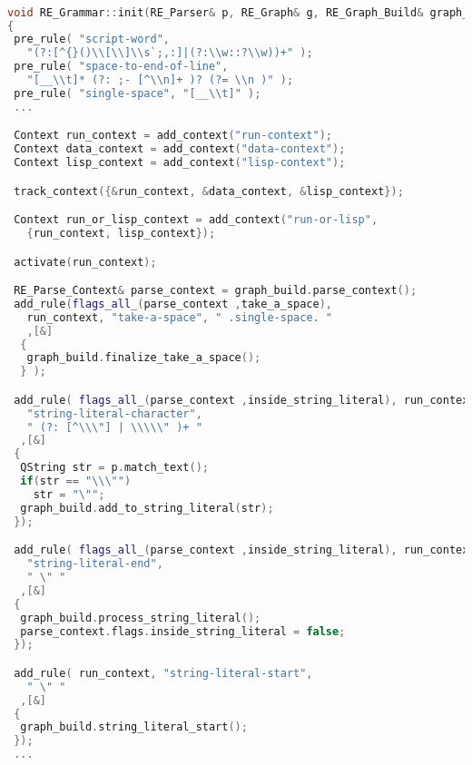 \begin{lstlisting}[caption={%
\emblink{\#lst--rzsyn--\thelstlisting.pgvm-pdf}{Excerpt from a Hypergraph-Oriented Parser}},
  language = C++, numbers = none,label={lst:rzsyn},
    basicstyle = \ttfamily\bfseries\footnotesize, linewidth = \linewidth]

void RE_Grammar::init(RE_Parser& p, RE_Graph& g, RE_Graph_Build& graph_build)
{
 pre_rule( "script-word", 
   "(?:[^{}()\\[\\]\\s`;,:]|(?:\\w::?\\w))+" );
 pre_rule( "space-to-end-of-line", 
   "[__\\t]* (?: ;- [^\\n]+ )? (?= \\n )" );
 pre_rule( "single-space", "[__\\t]" );
 ...

 Context run_context = add_context("run-context");
 Context data_context = add_context("data-context");
 Context lisp_context = add_context("lisp-context");

 track_context({&run_context, &data_context, &lisp_context});

 Context run_or_lisp_context = add_context("run-or-lisp",
   {run_context, lisp_context});

 activate(run_context);

 RE_Parse_Context& parse_context = graph_build.parse_context();
 add_rule(flags_all_(parse_context ,take_a_space), 
   run_context, "take-a-space", " .single-space. "
   ,[&]
  {
   graph_build.finalize_take_a_space();
  } );

 add_rule( flags_all_(parse_context ,inside_string_literal), run_context,
   "string-literal-character",
   " (?: [^\\\"] | \\\\\" )+ "
  ,[&]
 {
  QString str = p.match_text();
  if(str == "\\\"")
    str = "\"";
  graph_build.add_to_string_literal(str);
 });

 add_rule( flags_all_(parse_context ,inside_string_literal), run_context,
   "string-literal-end",
   " \" "
  ,[&]
 {
  graph_build.process_string_literal();
  parse_context.flags.inside_string_literal = false;
 });

 add_rule( run_context, "string-literal-start",
   " \" "
  ,[&]
 {
  graph_build.string_literal_start();
 });
 ...
 

\end{lstlisting}

